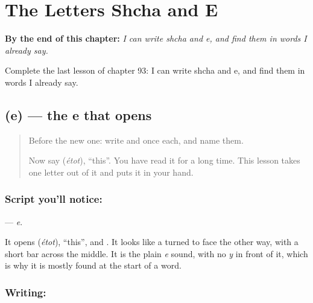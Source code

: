 
\chapter{The Letters Shcha and E}
\label{ch:ru-letters-shch-e}

\begin{chapteropening}
\textbf{By the end of this chapter:} \emph{I can write shcha and e, and find them in words I already say.}

Complete the last lesson of chapter 93: I can write shcha and e, and find them in words I already say.
\end{chapteropening}

\section[\texorpdfstring{\ru{э} (e)}{э (e)}]{ (e) — the e that opens }

\label{lesson:RU-W93-e}



\begin{quote}
Before the new one: write  and  once each, and name them.

Now say \textbf{} (\emph{étot}), \textquotedblleft{}this\textquotedblright{}. You have read it for a long time. This lesson takes one letter out of it and puts it in your hand.
\end{quote}

\subsection*{Script you'll notice: }
\textbf{} — \emph{e}.

It opens \textbf{} (\emph{étot}), \textquotedblleft{}this\textquotedblright{}, and \textbf{}. It looks like a \textbf{} turned to face the other way, with a short bar across the middle. It is the plain \emph{e} sound, with no \emph{y} in front of it, which is why it is mostly found at the start of a word.

\subsection*{Writing: }

